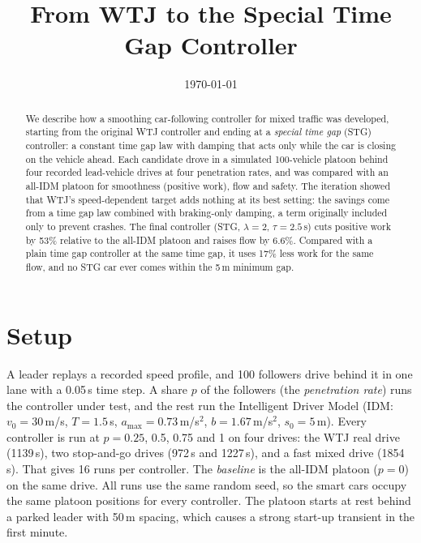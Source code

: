 \documentclass[11pt]{article}
\title{From WTJ to the Special Time Gap Controller}
\author{}
\date{\today}
\begin{document}
\maketitle

\begin{abstract}
We describe how a smoothing car-following controller for mixed traffic was developed, starting from the
original WTJ controller and ending at a \emph{special time gap} (STG) controller: a constant time gap law
with damping that acts only while the car is closing on the vehicle ahead. Each candidate drove in a
simulated 100-vehicle platoon behind four recorded lead-vehicle drives at four penetration rates, and was
compared with an all-IDM platoon for smoothness (positive work), flow and safety. The iteration showed
that WTJ's speed-dependent target adds nothing at its best setting: the savings come from a time gap law
combined with braking-only damping, a term originally included only to prevent crashes. The final
controller (STG, $\lambda=2$, $\tau=2.5$\,s) cuts positive work by 53\% relative to the all-IDM platoon and
raises flow by 6.6\%. Compared with a plain time gap controller at the same time gap, it uses 17\% less work
for the same flow, and no STG car ever comes within the 5\,m minimum gap.
\end{abstract}

\section{Setup}
\label{sec:setup}

A leader replays a recorded speed profile, and 100 followers drive behind it in one lane with a 0.05\,s
time step. A share $p$ of the followers (the \emph{penetration rate}) runs the controller under test, and
the rest run the Intelligent Driver Model (IDM: $v_0=30$\,m/s, $T=1.5$\,s, $a_{\max}=0.73$\,m/s$^2$,
$b=1.67$\,m/s$^2$, $s_0=5$\,m). Every controller is run at $p = 0.25$, 0.5, 0.75 and 1 on four drives: the
WTJ real drive (1139\,s), two stop-and-go drives (972\,s and 1227\,s), and a fast mixed drive (1854\,s).
That gives 16 runs per controller. The \emph{baseline} is the all-IDM platoon ($p=0$) on the same drive.
All runs use the same random seed, so the smart cars occupy the same platoon positions for every
controller. The platoon starts at rest behind a parked leader with 50\,m spacing, which causes a strong
start-up transient in the first minute.
\end{document}
